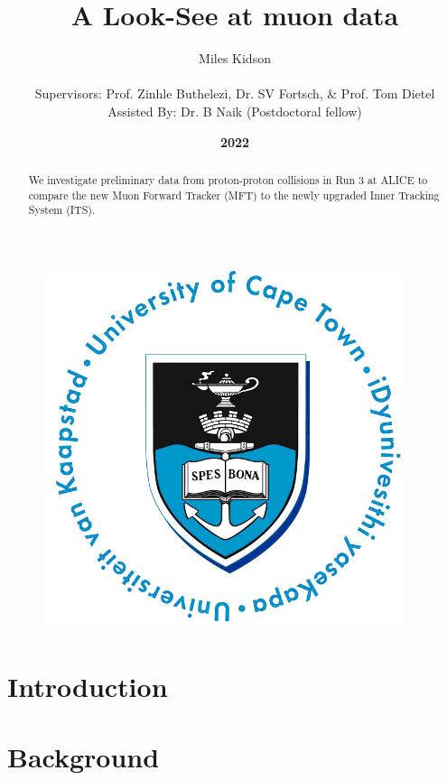 \documentclass[11pt]{article}
\title{{\Huge A Look-See at muon data}}
\author{{\Large Miles Kidson}\\ \\
Supervisors: Prof. Zinhle Buthelezi, Dr. SV Fortsch, \& Prof. Tom Dietel\\
Assisted By: Dr. B Naik (Postdoctoral fellow)}
\date{\textbf{2022}}
\numberwithin{equation}{section}
\numberwithin{figure}{section}
\numberwithin{table}{section}
\begin{document}
    
\maketitle

\begin{figure}[h]
    \begin{center}
        \includegraphics{Figs/UCT.jpg}
    \end{center}
\end{figure}

\begin{abstract}
    \centering
    We investigate preliminary data from proton-proton collisions in Run 3 at ALICE to compare the new Muon Forward Tracker (MFT) to the newly upgraded Inner Tracking System (ITS).
\end{abstract}

\newpage
\tableofcontents

\newpage
\section{Introduction}\label{sec:Introduction}
    

\section{Background}\label{sec:Background}



\printbibliography
\end{document}
